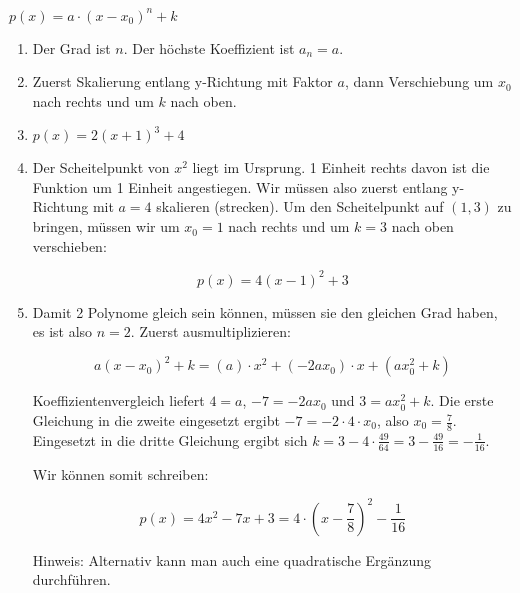 \item $p(x) = a\cdot \left(x-x_0\right)^n+k$

\begin{enumerate}

\item Der Grad ist $n$. Der höchste Koeffizient ist $a_n = a$.

\item Zuerst Skalierung entlang y-Richtung mit Faktor $a$, dann Verschiebung um $x_0$ nach rechts und um $k$ nach oben.
\item $p(x) = 2(x+1)^3+4$

\item Der Scheitelpunkt von $x^2$ liegt im Ursprung. 1 Einheit rechts davon ist die Funktion um 1 Einheit angestiegen. Wir müssen also zuerst entlang y-Richtung mit $a=4$ skalieren (strecken). Um den Scheitelpunkt auf $(1,3)$ zu bringen, müssen wir um $x_0=1$ nach rechts und um $k=3$ nach oben verschieben:

$$p(x) = 4(x-1)^2+3$$

\item Damit 2 Polynome gleich sein können, müssen sie den gleichen Grad haben, es ist also $n=2$. Zuerst ausmultiplizieren:

$$a(x-x_0)^2+k =(a)\cdot x^2+(-2ax_0)\cdot x + (ax_0^2+k)$$

Koeffizientenvergleich liefert $4=a$, $-7=-2ax_0$ und $3=ax_0^2+k$. Die erste Gleichung in die zweite eingesetzt ergibt $-7=-2\cdot 4 \cdot x_0$, also $x_0=\frac{7}{8}$. Eingesetzt in die dritte Gleichung ergibt sich $k=3-4\cdot\frac{49}{64}=3-\frac{49}{16}=-\frac{1}{16}$.

Wir können somit schreiben:

$$p(x)=4x^2-7x+3 = 4\cdot \left(x-\frac{7}{8}\right)^2-\frac{1}{16}$$

Hinweis: Alternativ kann man auch eine quadratische Ergänzung durchführen.

\end{enumerate}

